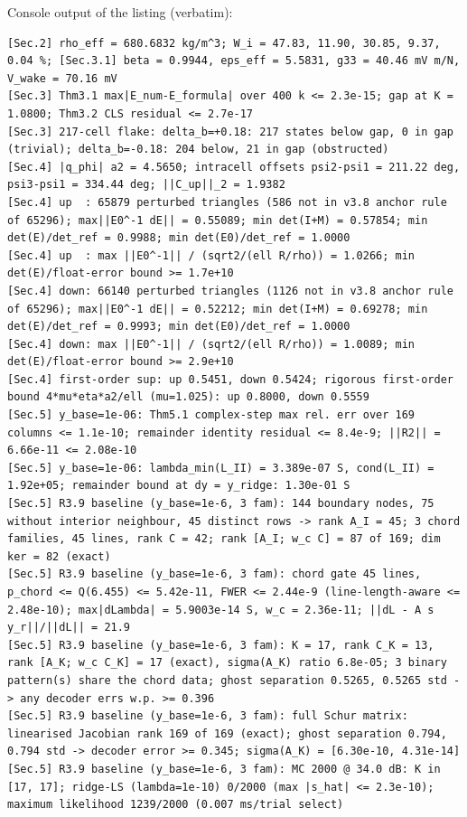 \documentclass[11pt,a4paper]{article}
\theoremstyle{definition}
\theoremstyle{remark}
\begin{document}
\noindent Console output of the listing (verbatim):
\begin{lstlisting}[style=consolestyle]
[Sec.2] rho_eff = 680.6832 kg/m^3; W_i = 47.83, 11.90, 30.85, 9.37, 0.04 %; [Sec.3.1] beta = 0.9944, eps_eff = 5.5831, g33 = 40.46 mV m/N, V_wake = 70.16 mV
[Sec.3] Thm3.1 max|E_num-E_formula| over 400 k <= 2.3e-15; gap at K = 1.0800; Thm3.2 CLS residual <= 2.7e-17
[Sec.3] 217-cell flake: delta_b=+0.18: 217 states below gap, 0 in gap (trivial); delta_b=-0.18: 204 below, 21 in gap (obstructed)
[Sec.4] |q_phi| a2 = 4.5650; intracell offsets psi2-psi1 = 211.22 deg, psi3-psi1 = 334.44 deg; ||C_up||_2 = 1.9382
[Sec.4] up  : 65879 perturbed triangles (586 not in v3.8 anchor rule of 65296); max||E0^-1 dE|| = 0.55089; min det(I+M) = 0.57854; min det(E)/det_ref = 0.9988; min det(E0)/det_ref = 1.0000
[Sec.4] up  : max ||E0^-1|| / (sqrt2/(ell R/rho)) = 1.0266; min det(E)/float-error bound >= 1.7e+10
[Sec.4] down: 66140 perturbed triangles (1126 not in v3.8 anchor rule of 65296); max||E0^-1 dE|| = 0.52212; min det(I+M) = 0.69278; min det(E)/det_ref = 0.9993; min det(E0)/det_ref = 1.0000
[Sec.4] down: max ||E0^-1|| / (sqrt2/(ell R/rho)) = 1.0089; min det(E)/float-error bound >= 2.9e+10
[Sec.4] first-order sup: up 0.5451, down 0.5424; rigorous first-order bound 4*mu*eta*a2/ell (mu=1.025): up 0.8000, down 0.5559
[Sec.5] y_base=1e-06: Thm5.1 complex-step max rel. err over 169 columns <= 1.1e-10; remainder identity residual <= 8.4e-9; ||R2|| = 6.66e-11 <= 2.08e-10
[Sec.5] y_base=1e-06: lambda_min(L_II) = 3.389e-07 S, cond(L_II) = 1.92e+05; remainder bound at dy = y_ridge: 1.30e-01 S
[Sec.5] R3.9 baseline (y_base=1e-6, 3 fam): 144 boundary nodes, 75 without interior neighbour, 45 distinct rows -> rank A_I = 45; 3 chord families, 45 lines, rank C = 42; rank [A_I; w_c C] = 87 of 169; dim ker = 82 (exact)
[Sec.5] R3.9 baseline (y_base=1e-6, 3 fam): chord gate 45 lines, p_chord <= Q(6.455) <= 5.42e-11, FWER <= 2.44e-9 (line-length-aware <= 2.48e-10); max|dLambda| = 5.9003e-14 S, w_c = 2.36e-11; ||dL - A s y_r||/||dL|| = 21.9
[Sec.5] R3.9 baseline (y_base=1e-6, 3 fam): K = 17, rank C_K = 13, rank [A_K; w_c C_K] = 17 (exact), sigma(A_K) ratio 6.8e-05; 3 binary pattern(s) share the chord data; ghost separation 0.5265, 0.5265 std -> any decoder errs w.p. >= 0.396
[Sec.5] R3.9 baseline (y_base=1e-6, 3 fam): full Schur matrix: linearised Jacobian rank 169 of 169 (exact); ghost separation 0.794, 0.794 std -> decoder error >= 0.345; sigma(A_K) = [6.30e-10, 4.31e-14]
[Sec.5] R3.9 baseline (y_base=1e-6, 3 fam): MC 2000 @ 34.0 dB: K in [17, 17]; ridge-LS (lambda=1e-10) 0/2000 (max |s_hat| <= 2.3e-10); maximum likelihood 1239/2000 (0.007 ms/trial select)

\end{lstlisting}
\end{document}
